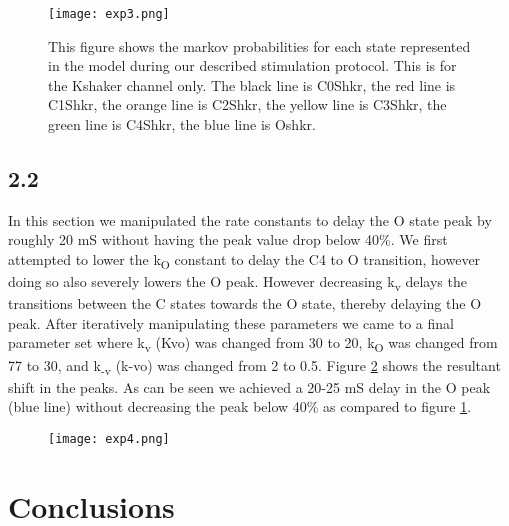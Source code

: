 \documentclass[12pt]{article}
\begin{document}
\begin{figure}[H]
	\centering
	\centering
	\texttt{[image: exp3.png]}
	
	\caption{ This figure shows the markov probabilities for each state represented in the model during our described stimulation protocol. This is for the Kshaker channel only. The black line is C0Shkr, the red line is C1Shkr, the orange line is C2Shkr, the yellow line is C3Shkr, the green line is C4Shkr, the blue line is Oshkr.}
	\label{fig:exp2.1}
\end{figure}


\subsection{2.2}
\par{}
In this section we manipulated the rate constants to delay the O state peak by roughly 20 mS without having the peak value drop below 40\%. We first attempted to lower the k\textsubscript{O} constant to delay the C4 to O transition, however doing so also severely lowers the O peak. However decreasing k\textsubscript{v} delays the transitions between the C states towards the O state, thereby delaying the O peak. After iteratively manipulating these parameters we came to a final parameter set where k\textsubscript{v} (Kvo) was changed from 30 to 20, k\textsubscript{O} was changed from 77 to 30, and k\textsubscript{-v} (k-vo) was changed from 2 to 0.5. Figure \ref{fig:exp2.2} shows the resultant shift in the peaks. As can be seen we achieved a 20-25 mS delay in the O peak (blue line) without decreasing the peak below 40\% as compared to figure \ref{fig:exp2.1}. 
\begin{figure}[H]
	\centering
	\centering
	\texttt{[image: exp4.png]}
	\caption{  }
	\label{fig:exp2.2}
\end{figure}



\section{Conclusions}
\par{}
\end{document}

